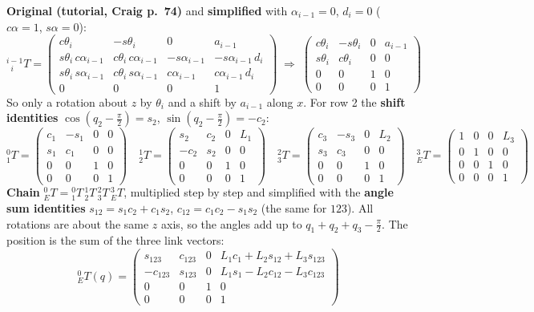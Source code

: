 \documentclass[10pt,a4paper]{article}
\begin{document}
\textbf{Original (tutorial, Craig p.~74)} and \textbf{simplified} with $\alpha_{i-1} = 0$, $d_i = 0$
($c\alpha = 1$, $s\alpha = 0$):
\[
  {}^{i-1}_{\;\;i}T =
  \begin{pmatrix}
    c\theta_i & -s\theta_i & 0 & a_{i-1} \\
    s\theta_i\, c\alpha_{i-1} & c\theta_i\, c\alpha_{i-1} & -s\alpha_{i-1} & -s\alpha_{i-1}\, d_i \\
    s\theta_i\, s\alpha_{i-1} & c\theta_i\, s\alpha_{i-1} & c\alpha_{i-1} & c\alpha_{i-1}\, d_i \\
    0 & 0 & 0 & 1
  \end{pmatrix}
  \;\Rightarrow\;
  \begin{pmatrix}
    c\theta_i & -s\theta_i & 0 & a_{i-1} \\
    s\theta_i & c\theta_i & 0 & 0 \\
    0 & 0 & 1 & 0 \\
    0 & 0 & 0 & 1
  \end{pmatrix}
\]
So only a rotation about $z$ by $\theta_i$ and a shift by $a_{i-1}$ along $x$. For row 2 the
\textbf{shift identities} $\cos(q_2 - \frac{\pi}{2}) = s_2$, $\sin(q_2 - \frac{\pi}{2}) = -c_2$:
\[
  {}^0_1T = \begin{pmatrix} c_1 & -s_1 & 0 & 0 \\ s_1 & c_1 & 0 & 0 \\ 0&0&1&0 \\ 0&0&0&1 \end{pmatrix}
  \quad
  {}^1_2T = \begin{pmatrix} s_2 & c_2 & 0 & L_1 \\ -c_2 & s_2 & 0 & 0 \\ 0&0&1&0 \\ 0&0&0&1 \end{pmatrix}
  \quad
  {}^2_3T = \begin{pmatrix} c_3 & -s_3 & 0 & L_2 \\ s_3 & c_3 & 0 & 0 \\ 0&0&1&0 \\ 0&0&0&1 \end{pmatrix}
  \quad
  {}^3_ET = \begin{pmatrix} 1 & 0 & 0 & L_3 \\ 0 & 1 & 0 & 0 \\ 0&0&1&0 \\ 0&0&0&1 \end{pmatrix}
\]
\textbf{Chain} ${}^0_ET = {}^0_1T\,{}^1_2T\,{}^2_3T\,{}^3_ET$, multiplied step by step and simplified with the
\textbf{angle sum identities} $s_{12} = s_1 c_2 + c_1 s_2$, $c_{12} = c_1 c_2 - s_1 s_2$ (the same for $123$). All
rotations are about the same $z$ axis, so the angles add up to $q_1 + q_2 + q_3 - \frac{\pi}{2}$. The position is the sum
of the three link vectors:
\[
  \boxed{
  {}^0_ET(q) =
  \begin{pmatrix}
    s_{123} & c_{123} & 0 & L_1 c_1 + L_2 s_{12} + L_3 s_{123} \\
    -c_{123} & s_{123} & 0 & L_1 s_1 - L_2 c_{12} - L_3 c_{123} \\
    0 & 0 & 1 & 0 \\
    0 & 0 & 0 & 1
  \end{pmatrix}}
\]
\end{document}
